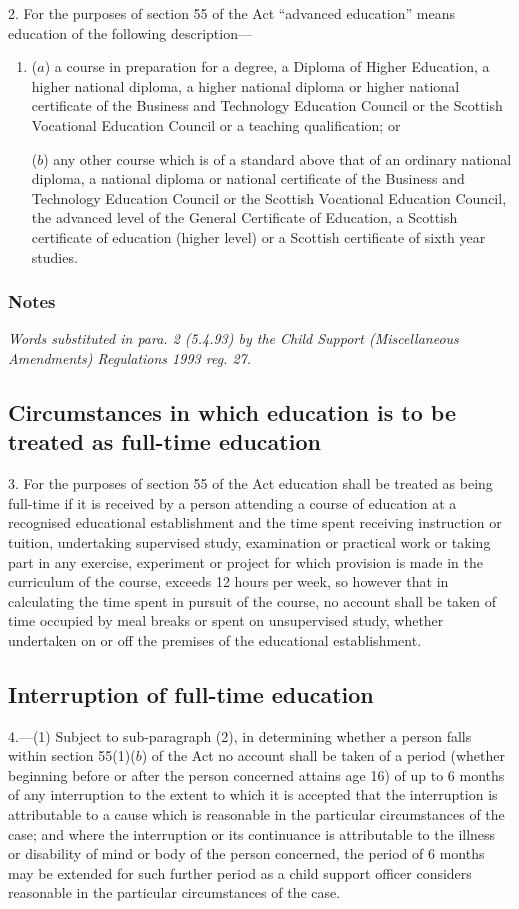\documentclass[a4paper]{article}
\newcommand\amendment[1]{\subsubsection*{Notes}{\itshape\frenchspacing\footnotesize #1 \par}}
\begin{document}
2.  For the purposes of section 55 of the Act “advanced education” means education of the following description—
\begin{enumerate}\item[]
($a$) a course in preparation for a degree, a Diploma of Higher Education, a higher national diploma, a higher national diploma or higher national certificate of the Business and 
Technology %
Education Council or the Scottish Vocational Education Council or a teaching qualification; or

($b$) any other course which is of a standard above that of an ordinary national diploma, a national diploma or national certificate of the Business and 
Technology %
 Education Council or the Scottish Vocational Education Council, the advanced level of the General Certificate of Education, a Scottish certificate of education (higher level) or a Scottish certificate of sixth year studies.
\end{enumerate}

\amendment{
Words substituted in para. 2 (5.4.93) by the Child Support (Miscellaneous Amendments) Regulations 1993 reg. 27.
}

\subsection*{Circumstances in which education is to be treated as full-time education}

3.  For the purposes of section 55 of the Act education shall be treated as being full-time if it is received by a person attending a course of education at a recognised educational establishment and the time spent receiving instruction or tuition, undertaking supervised study, examination or practical work or taking part in any exercise, experiment or project for which provision is made in the curriculum of the course, exceeds 12 hours per week, so however that in calculating the time spent in pursuit of the course, no account shall be taken of time occupied by meal breaks or spent on unsupervised study, whether undertaken on or off the premises of the educational establishment.

\subsection*{Interruption of full-time education}

4.—(1) Subject to sub-paragraph (2), in determining whether a person falls within section 55(1)($b$) of the Act no account shall be taken of a period (whether beginning before or after the person concerned attains age 16) of up to 6 months of any interruption to the extent to which it is accepted that the interruption is attributable to a cause which is reasonable in the particular circumstances of the case; and where the interruption or its continuance is attributable to the illness or disability of mind or body of the person concerned, the period of 6 months may be extended for such further period as a child support officer considers reasonable in the particular circumstances of the case.
\end{document}
